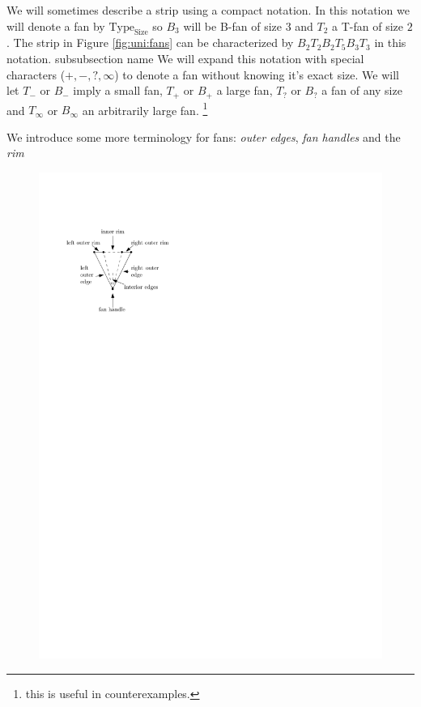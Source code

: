  We will sometimes describe a strip using a compact notation. In this notation we will denote a fan by $\text{Type}_\text{Size}$ so $B_3$ will be B-fan of size $3$ and $T_2$ a T-fan of size $2$. The strip in Figure \ref{fig:uni:fans} can be characterized by $B_2 T_2 B_2 T_5 B_3 T_3$ in this notation.
subsubsection name
 We will expand this notation with special characters ($+,-,?, \infty$) to denote a fan without knowing it's exact size.
 We will let $T_-$ or $B_-$ imply a small fan, $T_+$ or $B_+$ a large fan, $T_?$ or $B_?$ a fan of any size and $T_\infty$ or $B_\infty$ an arbitrarily large fan.
 \footnote{this is useful in counterexamples.}




We introduce some more terminology for fans: \emph{outer edges}, \emph{fan handles} and the \emph{rim}
\begin{figure}[h]
  \centering
  \includegraphics[scale=1]{unifiedAlgo/img/fanterms}
  \caption{}
  \label{fig:}
\end{figure}

